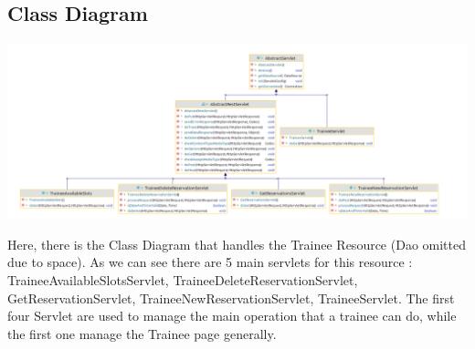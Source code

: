 \subsection{Class Diagram}

\includegraphics[width=\columnwidth]{resources/ClassDiagram.png}

Here, there is the Class Diagram that handles the Trainee Resource (Dao omitted due to space). As we can see there are 5 main servlets for this resource : TraineeAvailableSlotsServlet, TraineeDeleteReservationServlet, GetReservationServlet, TraineeNewReservationServlet, TraineeServlet. The first four Servlet are used to manage the main operation that a trainee can do, while the first one manage the Trainee page generally.
